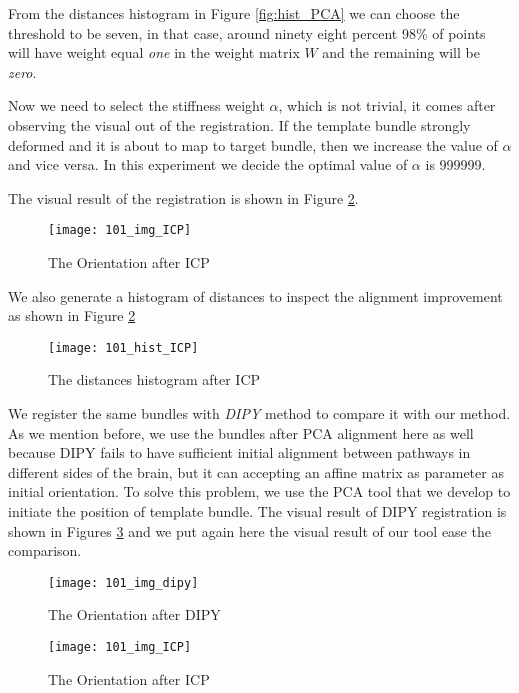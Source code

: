 \documentclass[../structure.tex]{subfiles}
\begin{document}
From the distances histogram in Figure \ref{fig:hist_PCA} we can choose the threshold to be seven, in that case, around ninety eight percent 98\% of points will have weight equal \textit{one} in the weight matrix $W$ and the remaining will be \textit{zero}.
\pagebreak

Now we need to select the stiffness weight $\alpha$, which is not trivial, it comes after observing the visual out of the registration. If the template bundle strongly deformed and it is about to map to target bundle, then we increase the value of $\alpha$ and vice versa. In this experiment we decide the optimal value of $\alpha$ is 999999.

The visual result of the registration is shown in Figure \ref{fig:hist_ICP}.
\begin{figure}[h!]
\centering
\texttt{[image: 101\_img\_ICP]}
\captionsetup{justification=centering}
\caption{The Orientation after ICP}
\label{fig:img_ICP}
\end{figure}

We also generate a histogram of distances to inspect the alignment improvement as shown in Figure \ref{fig:hist_ICP}

\begin{figure}[h!]
\centering
\texttt{[image: 101\_hist\_ICP]}
\captionsetup{justification=centering}
\caption{The distances histogram after ICP}
\label{fig:hist_ICP}
\end{figure}

We register the same bundles with \textit{DIPY} method to compare it with our method. As we mention before, we use the bundles after PCA alignment here as well because DIPY fails to have sufficient initial alignment between pathways in different sides of the brain, but it can accepting an affine matrix as parameter as initial orientation. To solve this problem, we use the PCA tool that we develop to initiate the position of template bundle. The visual result of DIPY registration is shown in Figures \ref{fig:img_dipy} and we put again here the visual result of our tool ease the comparison.

\begin{figure}[h!]
\centering
\texttt{[image: 101\_img\_dipy]}
\captionsetup{justification=centering}
\caption{The Orientation after DIPY}
\label{fig:img_dipy}
\end{figure}

\begin{figure}[h!]
\centering
\texttt{[image: 101\_img\_ICP]}
\captionsetup{justification=centering}
\caption{The Orientation after ICP}
\label{fig:img_ICP}
\end{figure}
\end{document}
